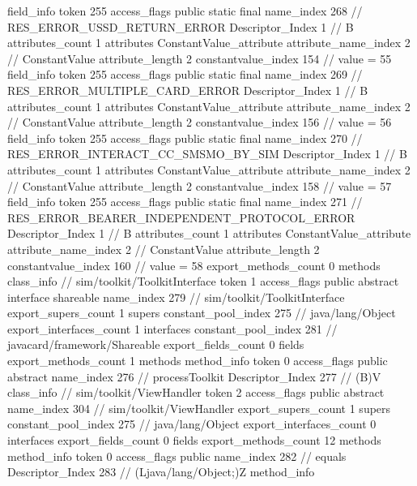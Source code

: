 {{{{{{{				}
				}
			}
			field_info {
				token	255
				access_flags	public static final
				name_index	268		// RES_ERROR_USSD_RETURN_ERROR
				Descriptor_Index	1		// B
				attributes_count	1
				attributes {
				ConstantValue_attribute {
					attribute_name_index	2		// ConstantValue
					attribute_length	2
					constantvalue_index	154		// value = 55
				}
				}
			}
			field_info {
				token	255
				access_flags	public static final
				name_index	269		// RES_ERROR_MULTIPLE_CARD_ERROR
				Descriptor_Index	1		// B
				attributes_count	1
				attributes {
				ConstantValue_attribute {
					attribute_name_index	2		// ConstantValue
					attribute_length	2
					constantvalue_index	156		// value = 56
				}
				}
			}
			field_info {
				token	255
				access_flags	public static final
				name_index	270		// RES_ERROR_INTERACT_CC_SMSMO_BY_SIM
				Descriptor_Index	1		// B
				attributes_count	1
				attributes {
				ConstantValue_attribute {
					attribute_name_index	2		// ConstantValue
					attribute_length	2
					constantvalue_index	158		// value = 57
				}
				}
			}
			field_info {
				token	255
				access_flags	public static final
				name_index	271		// RES_ERROR_BEARER_INDEPENDENT_PROTOCOL_ERROR
				Descriptor_Index	1		// B
				attributes_count	1
				attributes {
				ConstantValue_attribute {
					attribute_name_index	2		// ConstantValue
					attribute_length	2
					constantvalue_index	160		// value = 58
				}
				}
			}
			}
			export_methods_count	0
			methods {
			}
		}
		class_info {		// sim/toolkit/ToolkitInterface
			token	1
			access_flags	public abstract interface shareable
			name_index	279		// sim/toolkit/ToolkitInterface
			export_supers_count	1
			supers {
				constant_pool_index	275		// java/lang/Object
			}
			export_interfaces_count	1
			interfaces {
				constant_pool_index	281		// javacard/framework/Shareable
			}
			export_fields_count	0
			fields {
			}
			export_methods_count	1
			methods {
				method_info {
					token	0
					access_flags	public abstract
					name_index	276		// processToolkit
					Descriptor_Index	277		// (B)V
				}
			}
		}
		class_info {		// sim/toolkit/ViewHandler
			token	2
			access_flags	public abstract
			name_index	304		// sim/toolkit/ViewHandler
			export_supers_count	1
			supers {
				constant_pool_index	275		// java/lang/Object
			}
			export_interfaces_count	0
			interfaces {
			}
			export_fields_count	0
			fields {
			}
			export_methods_count	12
			methods {
				method_info {
					token	0
					access_flags	public
					name_index	282		// equals
					Descriptor_Index	283		// (Ljava/lang/Object;)Z
				}
				method_info {
}}}}}
